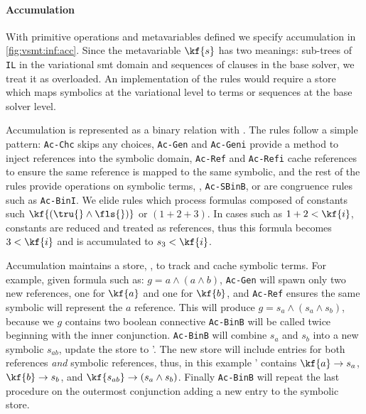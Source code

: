 \paragraph{Accumulation}
%
With primitive operations and metavariables defined we specify accumulation in
\autoref{fig:vsmt:inf:acc}. Since the metavariable $\kf{s}$ has two meanings:
sub-trees of \texttt{IL} in the variational \ac{smt} domain and sequences of
clauses in the base solver, we treat it as overloaded.
%
%
An implementation of the rules would require a store which maps symbolics at
the variational level to terms or sequences at the base solver level.

Accumulation is represented as a binary relation with \accumulation{}. The rules
follow a simple pattern: \texttt{Ac-Chc} skips any choices, \texttt{Ac-Gen} and
\texttt{Ac-Geni} provide a method to inject references into the symbolic domain,
\texttt{Ac-Ref} and \texttt{Ac-Refi} cache references to ensure the same
reference is mapped to the same symbolic, and the rest of the rules provide
operations on symbolic terms, \eg{}, \texttt{Ac-SBinB}, or are congruence rules
such as \texttt{Ac-BinI}. We elide rules which process formulas composed of
constants such $\kf{(\tru{} \wedge \fls{})}$ or $(1 + 2 + 3)$. In cases such as
$1 + 2 < \kf{i}$, constants are reduced and treated as references, thus this
formula becomes $3 < \kf{i}$ and is accumulated to $s_{3} < \kf{i}$.

Accumulation maintains a store, \aStore{}, to track and cache symbolic terms.
For example, given formula such as: $g = a \wedge (a \wedge b)$, \texttt{Ac-Gen}
will spawn only two new references, one for $\kf{a}$ and one for $\kf{b}$, and
\texttt{Ac-Ref} ensures the same symbolic will represent the $a$ reference. This
will produce $g = s_{a} \wedge (s_{a} \wedge s_{b})$, because we $g$ contains
two boolean connective \texttt{Ac-BinB} will be called twice beginning with the
inner conjunction. \texttt{Ac-BinB} will combine $s_{a}$ and $s_{b}$ into a new
symbolic $s_{ab}$, update the store to \aStore{}'. The new store will include
entries for both references \textit{and} symbolic references, thus, in this
example \aStore{}' contains $\kf{a} \rightarrow s_{a}$, $\kf{b} \rightarrow
s_{b}$, and $\kf{s_{ab}} \rightarrow (s_{a} \wedge s_{b})$. Finally
\texttt{Ac-BinB} will repeat the last procedure on the outermost conjunction
adding a new entry to the symbolic store.




